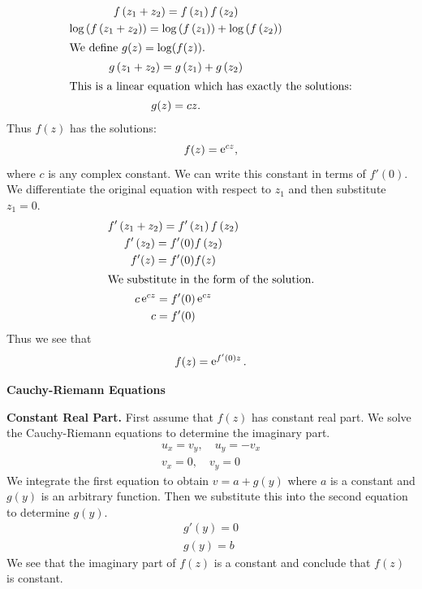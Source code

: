 {%
\begin{Solution}
  \label{solution f(z1+z2)=f(z1)f(z2)}
  \begin{gather*}
    f\left( z_1 + z_2 \right) = f\left( z_1 \right) f\left( z_2 \right) 
    \\
    \log\left( f\left( z_1 + z_2 \right) \right) 
    = \log\left( f\left( z_1 \right) \right) 
    + \log\left( f\left( z_2 \right) \right) 
    \\
    \intertext{We define $g(z) = \log( f(z) )$.}
    g\left( z_1 + z_2 \right) = g\left( z_1 \right) + g\left( z_2 \right) 
    \\
    \intertext{This is a linear equation which has exactly the solutions:}
    g(z) = c z.
  \end{gather*}
  Thus $f(z)$ has the solutions:
  \[
  f(z) = \mathop{\mathrm{e}}\nolimits^{c z},
  \]
  where $c$ is any complex constant.  We can write this constant in terms 
  of $f'(0)$.   We differentiate the original equation with respect to $z_1$
  and then substitute $z_1 = 0$.
  \begin{gather*}
    f'\left( z_1 + z_2 \right) = f'\left( z_1 \right) f\left( z_2 \right) 
    \\
    f'\left( z_2 \right) = f'(0) f\left( z_2 \right) 
    \\
    f'(z) = f'(0) f(z) 
    \\
    \intertext{We substitute in the form of the solution.}
    c \mathop{\mathrm{e}}\nolimits^{c z} = f'(0) \mathop{\mathrm{e}}\nolimits^{c z} 
    \\
    c = f'(0)
  \end{gather*}
  Thus we see that
  \[
  f(z) = \mathop{\mathrm{e}}\nolimits^{f'(0) z}.
  \]
\end{Solution}




\begin{large}
  \noindent
  \textbf{Cauchy-Riemann Equations}
\end{large}





\begin{Solution}
  \label{solution constant real imaginary modulus}
  \textbf{Constant Real Part.}
  First assume that $f(z)$ has constant real part.  We solve the 
  Cauchy-Riemann equations to determine the imaginary part.
  \begin{gather*}
    u_x = v_y, \quad u_y = - v_x
    \\
    v_x = 0, \quad v_y = 0
  \end{gather*}
  We integrate the first equation to obtain $v = a + g(y)$ where $a$ is a 
  constant and $g(y)$ is an arbitrary function.  Then we substitute this 
  into the second equation to determine $g(y)$.
  \begin{gather*}
    g'(y) = 0
    \\
    g(y) = b
  \end{gather*}
  We see that the imaginary part of $f(z)$ is a constant and conclude 
  that $f(z)$ is constant.



\end{Solution}}
